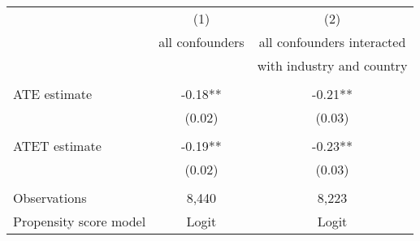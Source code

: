 \begin{tabular}{lcc} \hline
 & (1) & (2) \\
 & all confounders & all confounders interacted \\
 &  &  with industry and country \\ \hline
 &  &    \\
ATE estimate & -0.18** & -0.21** \\
 & (0.02) & (0.03) \\
 &  &    \\
ATET estimate & -0.19** & -0.23** \\
 & (0.02) & (0.03) \\
 &  &  \\
Observations & 8,440 & 8,223  \\
Propensity score model & Logit & Logit \\ \hline
\end{tabular}
